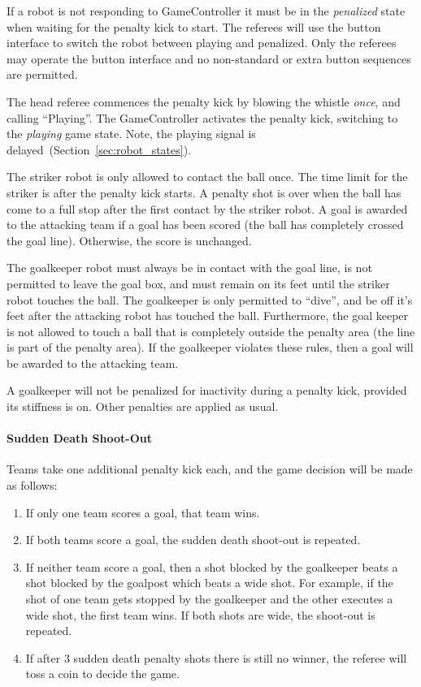 If a robot is not responding to GameController it must be in the \emph{penalized} state when waiting for the penalty kick to start.
The referees will use the button interface to switch the robot between playing and penalized. Only the referees may operate the button interface and no non-standard or extra button sequences are permitted.

The head referee commences the penalty kick by blowing the whistle \textit{once}, and calling ``Playing''.
The GameController activates the penalty kick, switching to the \emph{playing} game state.
Note, the playing signal is delayed~(\cf Section~\ref{sec:robot_states}).

The striker robot is only allowed to contact the ball once. The time limit for the striker is \PenaltyKickTime after the penalty kick starts. A penalty shot is over when the ball has come to a full stop after the first contact by the striker robot. A goal is awarded to the attacking team if a goal has been scored (\ie the ball has completely crossed the goal line). Otherwise, the score is unchanged.

The goalkeeper robot must always be in contact with the goal line, is not permitted to leave the goal box, and must remain on its feet until the striker robot touches the ball. The goalkeeper is only permitted to ``dive'', and be off it's feet after the attacking robot has touched the ball. Furthermore, the goal keeper is not allowed to touch a ball that is completely outside the penalty area (the line is part of the penalty area). If the goalkeeper violates these rules, then a goal will be awarded to the attacking team.

A goalkeeper will not be penalized for inactivity during a penalty kick, provided its stiffness is on. Other penalties are applied as usual.

\paragraph{Sudden Death Shoot-Out}
\label{sec:sudden_death_shoot_out}

Teams take one additional penalty kick each, and the game decision will be made as follows:
\begin{enumerate}
  \item If only one team scores a goal, that team wins.
  \item If both teams score a goal, the sudden death shoot-out is repeated.
  \item If neither team score a goal, then a shot blocked by the goalkeeper beats a shot blocked by the goalpost which beats a wide shot. For example, if the shot of one team gets stopped by the goalkeeper and the other executes a wide shot, the first team wins. If both shots are wide, the shoot-out is repeated.
  \item If after 3 sudden death penalty shots there is still no winner, the referee will toss a coin to decide the game.
\end{enumerate}

